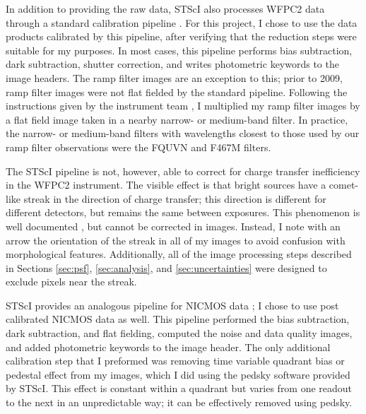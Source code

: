 In addition to providing the raw data, STScI also processes WFPC2 data through a standard calibration pipeline \citep{WFPC2}. For this project, I chose to use the data products calibrated by this pipeline, after verifying that the reduction steps were suitable for my purposes. In most cases, this pipeline performs bias subtraction, dark subtraction, shutter correction, and writes photometric keywords to the image headers. The ramp filter images are an exception to this; prior to 2009, ramp filter images were not flat fielded by the standard pipeline. Following the instructions given by the instrument team \footnotemark[8], I multiplied my ramp filter images by a flat field image taken in a nearby narrow- or medium-band filter. In practice, the narrow- or medium-band filters with wavelengths closest to those used by our ramp filter observations were the FQUVN and F467M filters.
 



The STScI pipeline is not, however, able to correct for charge transfer inefficiency in the WFPC2 instrument.  The visible effect is that bright sources have a comet-like streak in the direction of charge transfer; this direction is different for different detectors, but remains the same between exposures. This phenomenon is well documented \citep{Whitmore1997,Whitmore1999}, but cannot be corrected in images.  Instead, I note with an arrow the orientation of the streak in all of my images to avoid confusion with morphological features. Additionally, all of the image processing steps described in Sections \ref{sec:psf}, \ref{sec:analysis}, and \ref{sec:uncertainties} were designed to exclude pixels near the streak.

STScI provides an analogous pipeline for NICMOS data \citep{NICMOS}; I chose to use post calibrated NICMOS data as well. This pipeline performed the bias subtraction, dark subtraction, and flat fielding, computed the noise and data quality images, and added photometric keywords to the image header. The only additional calibration step that I preformed was removing time variable quadrant bias or pedestal effect from my images, which I did using the pedsky software \citep{NICMOS} provided by STScI. This effect is constant within a quadrant but varies from one readout to the next in an unpredictable way; it can be effectively removed using pedsky.

